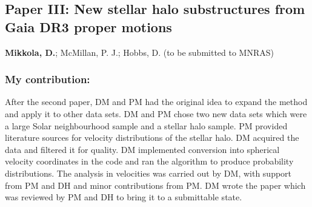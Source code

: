 \subsection*{Paper III: New stellar halo substructures from Gaia DR3 proper motions}
\textbf{Mikkola, D.}; McMillan, P. J.; Hobbs, D. (to be submitted to MNRAS) \newline

\subsubsection*{My contribution:}
After the second paper, DM and PM had the original idea to expand the method and apply it to other data sets. DM and PM chose two new data sets which were a large Solar neighbourhood sample and a stellar halo sample. PM provided literature sources for velocity distributions of the stellar halo. DM acquired the data and filtered it for quality. DM implemented conversion into spherical velocity coordinates in the code and ran the algorithm to produce probability distributions. The analysis in velocities was carried out by DM, with support from PM and DH and minor contributions from PM. DM wrote the paper which was reviewed by PM and DH to bring it to a submittable state.
\newpage




